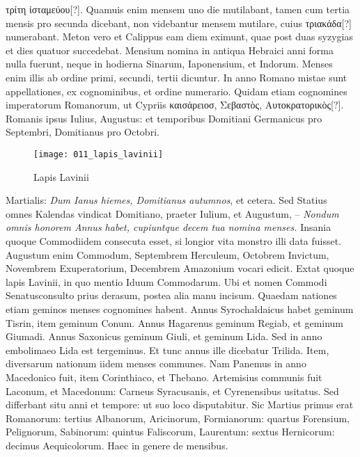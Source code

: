  \textgreek{τρίτη ἰσταμεύου[?]}.
Quamuis
enim mensem uno die mutilabant, tamen cum tertia mensis
pro secunda dicebant, non videbantur mensem mutilare, cuius
\textgreek{τριακάδα[?]} numerabant.
Meton vero et Calippus eam diem eximunt,
quae post duas syzygias et dies quatuor succedebat.
Mensium nomina
in antiqua Hebraici anni forma nulla fuerunt, neque in hodierna
Sinarum, Iaponensium, et Indorum.
Menses enim illis ab ordine
primi, secundi, tertii dicuntur.
In anno Romano mistae sunt appellationes,
ex cognominibus, et ordine numerario.
Quidam etiam cognomines
imperatorum Romanorum, ut Cypriis \textgreek{καισάρειοσ, Σεβαστὸς,
Αυτοκρατορικὸς[?]}.
Romanis ipsus Iulius, Augustus: et temporibus Domitiani
Germanicus pro Septembri, Domitianus pro Octobri.
\begin{figure}[t]
  \centering
  \texttt{[image: 011\_lapis\_lavinii]}
  \caption{Lapis Lavinii}
  \label{fig:lapis_lavinii}
\end{figure}
Martialis:
 \textit{Dum Ianus hiemes, Domitianus
autumnos}, et cetera.
Sed Statius omnes
Kalendas vindicat Domitiano,
praeter Iulium, et Augustum,
– \textit{Nondum omnis honorem
Annus habet, cupiuntque decem tua
nomina menses.}
Insania quoque
Commodiidem consecuta esset, si
longior vita monstro illi data fuisset.
Augustum enim Commodum,
Septembrem Herculeum, Octobrem
Invictum, Novembrem
Exuperatorium, Decembrem
Amazonium vocari edicit.
Extat
quoque lapis Lavinii, in quo mentio
Iduum Commodarum.
Ubi et
nomen Commodi Senatusconsulto prius derasum, postea alia manu
incisum.
%
Quaedam nationes etiam geminos menses cognomines habent.
Annus Syrochaldaicus habet geminum Tisrin, item geminum Conum.
Annus Hagarenus geminum Regiab, et geminum Giumadi.
Annus Saxonicus geminum Giuli, et geminum Lida.
Sed in
anno embolimaeo Lida est tergeminus.
Et tunc annus ille dicebatur
Trilida.
Item, diversarum nationum iidem menses communes.
Nam
Panemus in anno Macedonico fuit, item Corinthiaco, et Thebano.
Artemisius communis fuit Laconum, et Macedonum: Carneus Syracusanis,
et Cyrenensibus usitatus.
Sed differbant situ anni et tempore:
ut suo loco disputabitur.
Sic Martius primus erat Romanorum:
tertius Albanorum, Aricinorum, Formianorum: quartus Forensium,
Pelignorum, Sabinorum: quintus Faliscorum, Laurentum:
sextus Hernicorum: decimus Aequicolorum.
Haec in genere
de mensibus.
